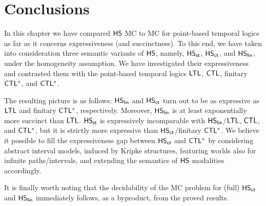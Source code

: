 \section{Conclusions}
In this chapter we have compared $\text{\sffamily HS}$ MC to MC for point-based temporal logics as far as it concerns expressiveness (and succinctness). To this end, we have taken into consideration three semantic variants  of $\text{\sffamily HS}$, namely, $\text{\sffamily HS}_{\mathsf{st}}$, $\text{\sffamily HS}_{\mathsf{ct}}$, and $\text{\sffamily HS}_{\mathsf{lin}}$, under the homogeneity assumption. We have investigated their expressiveness and contrasted them with the point-based temporal logics $\text{\sffamily LTL}$, $\text{\sffamily CTL}$, finitary $\text{\sffamily CTL$^{*}$}$, and $\text{\sffamily CTL$^{*}$}$.

The resulting picture is as follows: $\text{\sffamily HS}_{\mathsf{lin}}$ and $\text{\sffamily HS}_{\mathsf{ct}}$ turn out to be as expressive as $\text{\sffamily LTL}$ and finitary $\text{\sffamily CTL$^{*}$}$, respectively. Moreover, $\text{\sffamily HS}_{\mathsf{lin}}$ is at least exponentially more succinct than $\text{\sffamily LTL}$.
$\text{\sffamily HS}_{\mathsf{st}}$ is expressively incomparable with $\text{\sffamily HS}_{\mathsf{lin}}$/$\text{\sffamily LTL}$, $\text{\sffamily CTL}$, and $\text{\sffamily CTL$^{*}$}$, but it is strictly more expressive than $\text{\sffamily HS}_{\mathsf{ct}}$/finitary $\text{\sffamily CTL$^{*}$}$.
%
We believe it possible to fill the expressiveness gap between $\text{\sffamily HS}_{\mathsf{ct}}$ and $\text{\sffamily CTL$^{*}$}$ by considering abstract interval models, induced by Kripke structures, featuring worlds also for infinite paths/intervals, and extending the semantics of $\text{\sffamily HS}$ modalities accordingly. %

It is finally worth noting that the decidability of the MC problem for (full) $\text{\sffamily HS}_{\mathsf{ct}}$ and $\text{\sffamily HS}_{\mathsf{lin}}$ immediately follows, as a byproduct, from the proved results. 